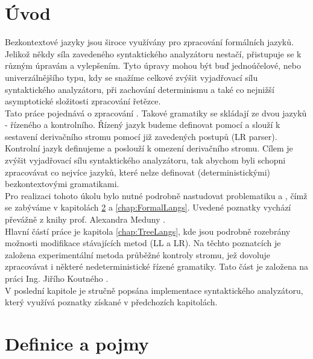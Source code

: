 
\chapter{Úvod}

Bezkontextové jazyky jsou široce využívány pro zpracování formálních jazyků.
Jelikož někdy síla zavedeného syntaktického analyzátoru nestačí, přistupuje
se k různým úpravám a vylepšením.
Tyto úpravy mohou být buď jednoúčelové, nebo univerzálnějšího typu, kdy
se snažíme celkové zvýšit vyjadřovací sílu syntaktického analyzátoru,
při zachování determinismu a také co nejnižší asymptotické složitosti
zpracování řetězce.\\

Tato práce pojednává o zpracování .
Takové gramatiky se skládají ze dvou jazyků - řízeného a kontrolního.
Řízený jazyk budeme definovat pomocí  a
slouží k sestavení derivačního stromu pomocí již zavedených postupů
(LR parser).
Kontrolní jazyk definujeme  a poslouží k
omezení derivačního stromu. Cílem je zvýšit vyjadřovací sílu
syntaktického analyzátoru, tak abychom byli schopni zpracovávat co
nejvíce jazyků, které nelze definovat (deterministickými) bezkontextovými
gramatikami.\\

Pro realizaci tohoto úkolu bylo nutné podrobně nastudovat problematiku
 a , čímž se zabýváme
v kapitolách \ref{chap:Definitions} a \ref{chap:FormalLangs}. Uvedené
poznatky vychází převážně z knihy prof. Alexandra Meduny \cite{MedunaIFJ}.\\

Hlavní částí práce je kapitola \ref{chap:TreeLangs}, kde jsou podrobně rozebrány
možnosti modifikace stávajících metod (LL a LR). Na těchto poznatcích je
založena experimentální metoda
průběžné kontroly stromu, jež dovoluje zpracovávat i některé nedeterministické
řízené gramatiky. Tato část je založena na práci Ing. Jiřího Koutného
\cite{Koutny}.\\

V poslední kapitole je stručně popsána implementace syntaktického analyzátoru,
který využívá poznatky získané v předchozích kapitolách.


\chapter{Definice a pojmy}
\label{chap:Definitions}

